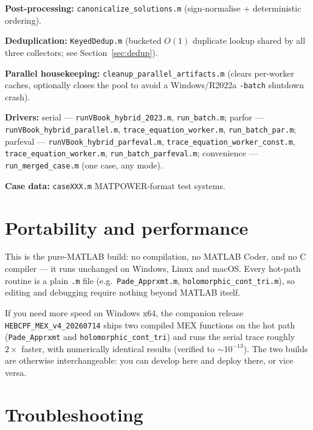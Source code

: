 \documentclass[11pt,a4paper]{article}
\newcommand{\code}[1]{\texttt{#1}}
\begin{document}
\textbf{Post-processing:} \code{canonicalize_solutions.m} (sign-normalise + deterministic
ordering).

\textbf{Deduplication:} \code{KeyedDedup.m} (bucketed $O(1)$ duplicate lookup shared by all
three collectors; see Section~\ref{sec:dedup}).

\textbf{Parallel housekeeping:} \code{cleanup_parallel_artifacts.m} (clears per-worker
caches, optionally closes the pool to avoid a Windows/R2022a \code{-batch} shutdown
crash).

\textbf{Drivers:}
serial --- \code{runVBook_hybrid_2023.m}, \code{run_batch.m};
parfor --- \code{runVBook_hybrid_parallel.m}, \code{trace_equation_worker.m},
\code{run_batch_par.m};
parfeval --- \code{runVBook_hybrid_parfeval.m}, \code{trace_equation_worker_const.m},
\code{trace_equation_worker.m}, \code{run_batch_parfeval.m};
convenience --- \code{run_merged_case.m} (one case, any mode).

\textbf{Case data:} \code{caseXXX.m} MATPOWER-format test systems.

\section{Portability and performance}

This is the pure-MATLAB build: no compilation, no MATLAB Coder, and no C compiler --- it
runs unchanged on Windows, Linux and macOS. Every hot-path routine is a plain \code{.m}
file (e.g.\ \code{Pade_Apprxmt.m}, \code{holomorphic_cont_tri.m}), so editing and
debugging require nothing beyond MATLAB itself.

If you need more speed on Windows x64, the companion release \code{HEBCPF_MEX_v4_20260714}
ships two compiled MEX functions on the hot path (\code{Pade_Apprxmt} and
\code{holomorphic_cont_tri}) and runs the serial trace roughly $2\times$ faster, with
numerically identical results (verified to $\sim 10^{-13}$). The two builds are otherwise
interchangeable: you can develop here and deploy there, or vice versa.

\section{Troubleshooting}
\end{document}
